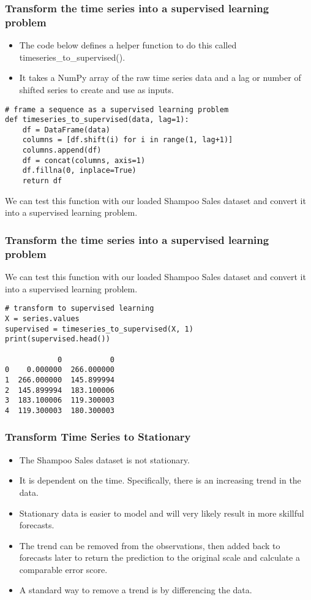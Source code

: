 \begin{frame}[fragile] \frametitle{Transform the time series into a supervised learning problem}
\begin{itemize}
\item The code below defines a helper function to do this called timeseries\_to\_supervised(). 
\item It takes a NumPy array of the raw time series data and a lag or number of shifted series to create and use as inputs.
\end{itemize}
\begin{lstlisting}
# frame a sequence as a supervised learning problem
def timeseries_to_supervised(data, lag=1):
	df = DataFrame(data)
	columns = [df.shift(i) for i in range(1, lag+1)]
	columns.append(df)
	df = concat(columns, axis=1)
	df.fillna(0, inplace=True)
	return df
\end{lstlisting}   
We can test this function with our loaded Shampoo Sales dataset and convert it into a supervised learning problem.
\end{frame}

\begin{frame}[fragile] \frametitle{Transform the time series into a supervised learning problem}
We can test this function with our loaded Shampoo Sales dataset and convert it into a supervised learning problem.
\begin{lstlisting}
# transform to supervised learning
X = series.values
supervised = timeseries_to_supervised(X, 1)
print(supervised.head())

            0           0
0    0.000000  266.000000
1  266.000000  145.899994
2  145.899994  183.100006
3  183.100006  119.300003
4  119.300003  180.300003
\end{lstlisting}   
\end{frame}

\begin{frame}[fragile] \frametitle{Transform Time Series to Stationary}
\begin{itemize}
\item The Shampoo Sales dataset is not stationary.
\item It  is dependent on the time. Specifically, there is an increasing trend in the data.
\item Stationary data is easier to model and will very likely result in more skillful forecasts.
\item The trend can be removed from the observations, then added back to forecasts later to return the prediction to the original scale and calculate a comparable error score.
\item A standard way to remove a trend is by differencing the data. 
\end{itemize}

\end{frame}

